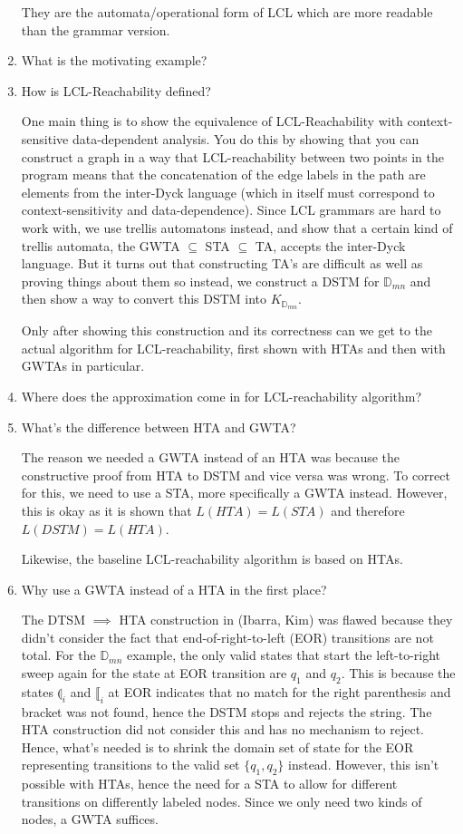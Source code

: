 \documentclass[11pt]{article}
\begin{document}
\begin{enumerate}
  They are the automata/operational form of LCL which are more readable than the grammar version.

  \item What is the motivating example?
  \item How is LCL-Reachability defined?

  One main thing is to show the equivalence of LCL-Reachability with context-sensitive data-dependent analysis. You do this by showing that you can construct a graph in a way that LCL-reachability between two points in the program means that the concatenation of the edge labels in the path are elements from the inter-Dyck language (which in itself must correspond to context-sensitivity and data-dependence). Since LCL grammars are hard to work with, we use trellis automatons instead, and show that a certain kind of trellis automata, the GWTA $\subseteq$ STA $\subseteq$ TA, accepts the inter-Dyck language. But it turns out that constructing TA's are difficult as well as proving things about them so instead, we construct a DSTM for $\mathbb{D}_{mn}$ and then show a way to convert this DSTM into $K_{\mathbb{D}_{mn}}$.

  Only after showing this construction and its correctness can we get to the actual algorithm for LCL-reachability, first shown with HTAs and then with GWTAs in particular.

  \item Where does the approximation come in for LCL-reachability algorithm?

  \item What's the difference between HTA and GWTA?

  The reason we needed a GWTA instead of an HTA was because the constructive proof from HTA to DSTM and vice versa was wrong. To correct for this, we need to use a STA, more specifically a GWTA instead. However, this is okay as it is shown that $L(HTA) = L(STA)$ and therefore $L(DSTM) = L(HTA)$.

  Likewise, the baseline LCL-reachability algorithm is based on HTAs.

  \item Why use a GWTA instead of a HTA in the first place?

  The DTSM $\implies$ HTA construction in (Ibarra, Kim) was flawed because they didn't consider the fact that end-of-right-to-left (EOR) transitions are not total. For the $\mathbb{D}_{mn}$ example, the only valid states that start the left-to-right sweep again for the state at EOR transition are $q_1$ and $q_2$. This is because the states $\llparenthesis_i$ and $\llbracket_i$ at EOR indicates that no match for the right parenthesis and bracket was not found, hence the DSTM stops and rejects the string. The HTA construction did not consider this and has no mechanism to reject. Hence, what's needed is to shrink the domain set of state for the EOR representing transitions to the valid set $\{q_1, q_2\}$ instead. However, this isn't possible with HTAs, hence the need for a STA to allow for different transitions on differently labeled nodes. Since we only need two kinds of nodes, a GWTA suffices.


\end{enumerate}
\end{document}
